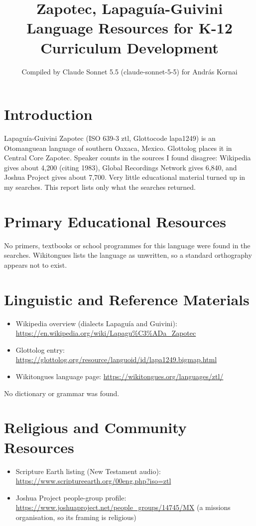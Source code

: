 \documentclass[12pt]{article}
\title{Zapotec, Lapagu\'ia-Guivini Language Resources for K-12 Curriculum Development}
\author{Compiled by Claude Sonnet 5.5 (claude-sonnet-5-5) for Andr\'as Kornai}
\date{}
\begin{document}
\maketitle

\section{Introduction}
Lapagu\'ia-Guivini Zapotec (ISO 639-3 ztl, Glottocode lapa1249) is an Otomanguean language of southern Oaxaca, Mexico. Glottolog places it in Central Core Zapotec. Speaker counts in the sources I found disagree: Wikipedia gives about 4,200 (citing 1983), Global Recordings Network gives 6,840, and Joshua Project gives about 7,700. Very little educational material turned up in my searches. This report lists only what the searches returned.

\section{Primary Educational Resources}
No primers, textbooks or school programmes for this language were found in the searches. Wikitongues lists the language as unwritten, so a standard orthography appears not to exist.

\section{Linguistic and Reference Materials}
\begin{itemize}
\item Wikipedia overview (dialects Lapagu\'ia and Guivini): \url{https://en.wikipedia.org/wiki/Lapagu%C3%ADa_Zapotec}
\item Glottolog entry: \url{https://glottolog.org/resource/languoid/id/lapa1249.bigmap.html}
\item Wikitongues language page: \url{https://wikitongues.org/languages/ztl/}
\end{itemize}
No dictionary or grammar was found.

\section{Religious and Community Resources}
\begin{itemize}
\item Scripture Earth listing (New Testament audio): \url{https://www.scriptureearth.org/00eng.php?iso=ztl}
\item Joshua Project people-group profile: \url{https://www.joshuaproject.net/people_groups/14745/MX} (a missions organisation, so its framing is religious)
\end{itemize}
\end{document}
